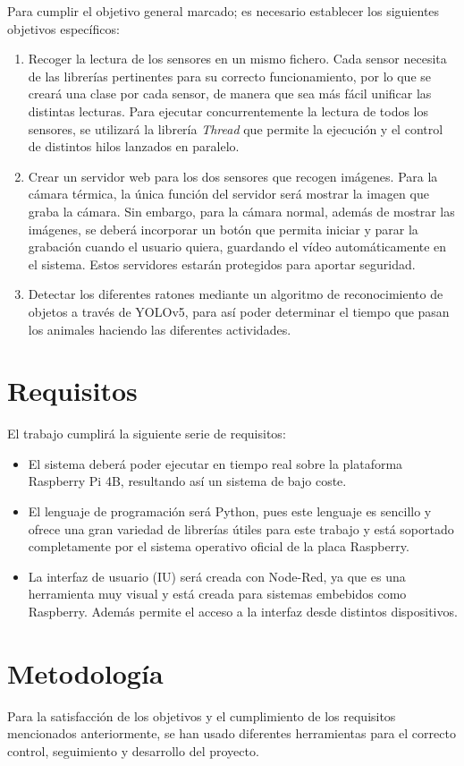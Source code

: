 Para cumplir el objetivo general marcado; es necesario establecer los siguientes objetivos específicos:
\begin{enumerate}
 \item Recoger la lectura de los sensores en un mismo fichero. Cada sensor necesita de las librerías pertinentes para su correcto funcionamiento, por lo que se creará una clase por cada sensor, de manera que sea más fácil unificar las distintas lecturas. Para ejecutar concurrentemente la lectura de todos los sensores, se utilizará la librería \textit{Thread} que permite la ejecución y el control de distintos hilos lanzados en paralelo.
 \item Crear un servidor web para los dos sensores que recogen imágenes. Para la cámara térmica, la única función del servidor será mostrar la imagen que graba la cámara. Sin embargo, para la cámara normal, además de mostrar las imágenes, se deberá incorporar un botón que permita iniciar y parar la grabación cuando el usuario quiera, guardando el vídeo automáticamente en el sistema. Estos servidores estarán protegidos para aportar seguridad.
 \item Detectar los diferentes ratones mediante un algoritmo de reconocimiento de objetos a través de YOLOv5, para así poder determinar el tiempo que pasan los animales haciendo las diferentes actividades.
\end{enumerate}

\section{Requisitos}
\label{sec:requisitos}
El trabajo cumplirá la siguiente serie de requisitos:
\begin{itemize}
 \item El sistema deberá poder ejecutar en tiempo real sobre la plataforma Raspberry Pi 4B, resultando así un sistema de bajo coste.
 \item El lenguaje de programación será Python, pues este lenguaje es sencillo y ofrece una gran variedad de librerías útiles para este trabajo y está soportado completamente por el sistema operativo oficial de la placa Raspberry.
 \item La interfaz de usuario (IU) será creada con Node-Red, ya que es una herramienta muy visual y está creada para sistemas embebidos como Raspberry. Además permite el acceso a la interfaz desde distintos dispositivos.
\end{itemize}

\section{Metodología}
\label{sec:metodologia}
Para la satisfacción de los objetivos y el cumplimiento de los requisitos mencionados anteriormente, se han usado diferentes herramientas para el correcto control, seguimiento y desarrollo del proyecto.\\

